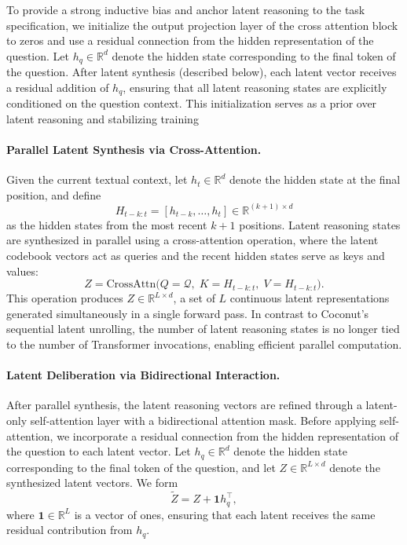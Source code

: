 To provide a strong inductive bias and anchor latent reasoning to the task specification, we initialize the output projection layer of the cross attention block to zeros and use a residual connection from the hidden representation of the question. Let $h_q \in \mathbb{R}^d$ denote the hidden state corresponding to the final token of the question. After latent synthesis (described below), each latent vector receives a residual addition of $h_q$, ensuring that all latent reasoning states are explicitly conditioned on the question context. This initialization serves as a prior over latent reasoning and stabilizing training 

\paragraph{Parallel Latent Synthesis via Cross-Attention.}
Given the current textual context, let $h_t \in \mathbb{R}^d$ denote the hidden state at the final position, and define
\[
H_{t-k:t} = [h_{t-k}, \dots, h_t] \in \mathbb{R}^{(k+1) \times d}
\]
as the hidden states from the most recent $k+1$ positions. Latent reasoning states are synthesized in parallel using a cross-attention operation, where the latent codebook vectors act as queries and the recent hidden states serve as keys and values:
\[
Z = \mathrm{CrossAttn}\bigl(Q = \mathcal{Q},\; K = H_{t-k:t},\; V = H_{t-k:t}\bigr).
\]
This operation produces $Z \in \mathbb{R}^{L \times d}$, a set of $L$ continuous latent representations generated simultaneously in a single forward pass. In contrast to Coconut’s sequential latent unrolling, the number of latent reasoning states is no longer tied to the number of Transformer invocations, enabling efficient parallel computation.


\paragraph{Latent Deliberation via Bidirectional Interaction.}
After parallel synthesis, the latent reasoning vectors are refined through a latent-only self-attention layer with a bidirectional attention mask. Before applying self-attention, we incorporate a residual connection from the hidden representation of the question to each latent vector. Let $h_q \in \mathbb{R}^d$ denote the hidden state corresponding to the final token of the question, and let $Z \in \mathbb{R}^{L \times d}$ denote the synthesized latent vectors. We form
\[
\tilde{Z} = Z + \mathbf{1} h_q^\top,
\]
where $\mathbf{1} \in \mathbb{R}^{L}$ is a vector of ones, ensuring that each latent receives the same residual contribution from $h_q$.


